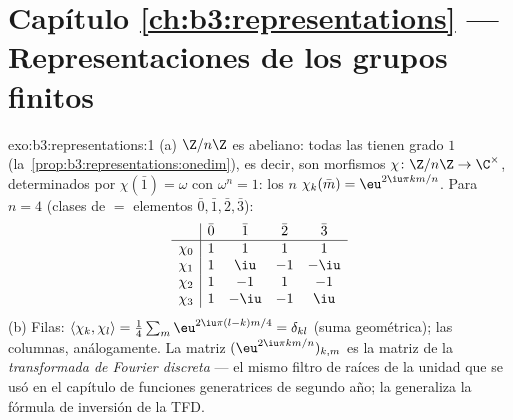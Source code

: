 \section*{Capítulo \ref{ch:b3:representations} --- Representaciones
de los grupos finitos}

\begin{solution}{exo:b3:representations:1}
(a) $\Z/n\Z$ es abeliano: todas las
 tienen grado $1$
(la~\cref{prop:b3:representations:onedim}), es decir, son morfismos
$\chi \colon \Z/n\Z \to \C^\times$, determinados por $\chi(\bar 1)
= \omega$ con $\omega^n = 1$: los $n$
 $\chi_k(\bar
m) = \eu^{2\iu\pi km/n}$. Para $n = 4$ (clases de $= $ elementos
$\bar0,\bar1,\bar2,\bar3$):
\[
\begin{array}{c|cccc}
& \bar0 & \bar1 & \bar2 & \bar3\\
\hline
\chi_0 & 1 & 1 & 1 & 1\\
\chi_1 & 1 & \iu & -1 & -\iu\\
\chi_2 & 1 & -1 & 1 & -1\\
\chi_3 & 1 & -\iu & -1 & \iu
\end{array}
\]
(b) Filas: $\langle\chi_k,\chi_l\rangle = \frac14\sum_m
\eu^{2\iu\pi(l-k)m/4} = \delta_{kl}$ (suma geométrica); las columnas,
análogamente. La matriz $(\eu^{2\iu\pi km/n})_{k,m}$ es la matriz de la
\emph{transformada de Fourier discreta} --- el mismo filtro de raíces de
la unidad que se usó en el capítulo de funciones generatrices de segundo
año; la  generaliza la fórmula de inversión de la TFD.
\end{solution}

